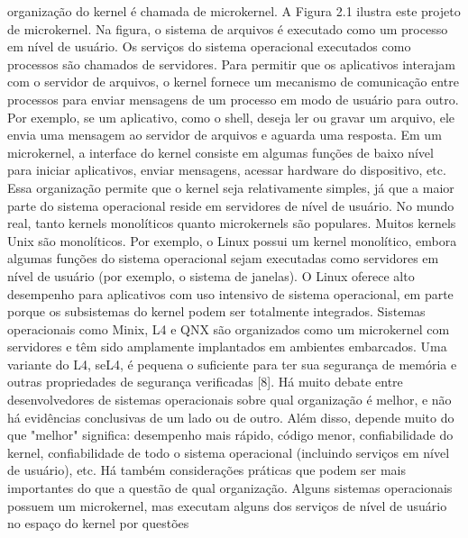 organização  do  kernel  é  chamada  de  microkernel.
 A  Figura  2.1  ilustra  este  projeto  de  microkernel.  Na  figura,  o  sistema  de  arquivos  é  executado  como  um  processo  em  nível  
de  usuário.  Os  serviços  do  sistema  operacional  executados  como  processos  são  chamados  de  servidores.  Para  permitir  que  os  
aplicativos  interajam  com  o  servidor  de  arquivos,  o  kernel  fornece  um  mecanismo  de  comunicação  entre  processos  para  enviar  
mensagens  de  um  processo  em  modo  de  usuário  para  outro.  Por  exemplo,  se  um  aplicativo,  como  o  shell,  deseja  ler  ou  gravar  
um  arquivo,  ele  envia  uma  mensagem  ao  servidor  de  arquivos  e  aguarda  uma  resposta.
 Em  um  microkernel,  a  interface  do  kernel  consiste  em  algumas  funções  de  baixo  nível  para  iniciar  aplicativos,  enviar  
mensagens,  acessar  hardware  do  dispositivo,  etc.  Essa  organização  permite  que  o  kernel  seja  relativamente  simples,  já  que  a  
maior  parte  do  sistema  operacional  reside  em  servidores  de  nível  de  usuário.
 No  mundo  real,  tanto  kernels  monolíticos  quanto  microkernels  são  populares.  Muitos  kernels  Unix  são  monolíticos.  Por  
exemplo,  o  Linux  possui  um  kernel  monolítico,  embora  algumas  funções  do  sistema  operacional  sejam  executadas  como  
servidores  em  nível  de  usuário  (por  exemplo,  o  sistema  de  janelas).  O  Linux  oferece  alto  desempenho  para  aplicativos  com  uso  
intensivo  de  sistema  operacional,  em  parte  porque  os  subsistemas  do  kernel  podem  ser  totalmente  integrados.
 Sistemas  operacionais  como  Minix,  L4  e  QNX  são  organizados  como  um  microkernel  com  servidores  e  têm  sido  amplamente  
implantados  em  ambientes  embarcados.  Uma  variante  do  L4,  seL4,  é  pequena  o  suficiente  para  ter  sua  segurança  de  memória  e  
outras  propriedades  de  segurança  verificadas  [8].
 Há  muito  debate  entre  desenvolvedores  de  sistemas  operacionais  sobre  qual  organização  é  melhor,  e  não  há  evidências  
conclusivas  de  um  lado  ou  de  outro.  Além  disso,  depende  muito  do  que  "melhor"  significa:  desempenho  mais  rápido,  código  
menor,  confiabilidade  do  kernel,  confiabilidade  de  todo  o  sistema  operacional  (incluindo  serviços  em  nível  de  usuário),  etc.
 Há  também  considerações  práticas  que  podem  ser  mais  importantes  do  que  a  questão  de  qual  organização.  Alguns  sistemas  
operacionais  possuem  um  microkernel,  mas  executam  alguns  dos  serviços  de  nível  de  usuário  no  espaço  do  kernel  por  questões  
